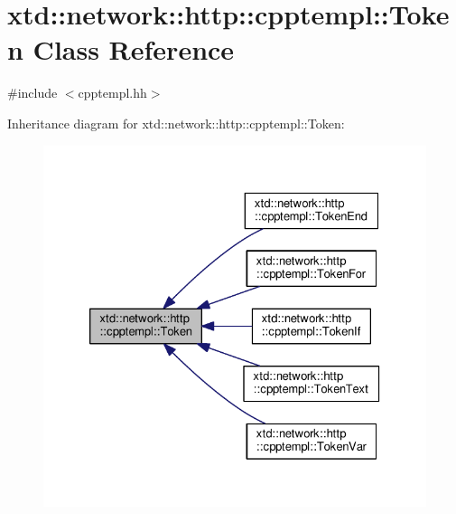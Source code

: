 \hypertarget{classxtd_1_1network_1_1http_1_1cpptempl_1_1Token}{}\section{xtd\+:\+:network\+:\+:http\+:\+:cpptempl\+:\+:Token Class Reference}
\label{classxtd_1_1network_1_1http_1_1cpptempl_1_1Token}


{\ttfamily \#include $<$cpptempl.\+hh$>$}



Inheritance diagram for xtd\+:\+:network\+:\+:http\+:\+:cpptempl\+:\+:Token\+:
\nopagebreak
\begin{figure}[H]
\begin{center}
\leavevmode
\includegraphics[width=326pt]{classxtd_1_1network_1_1http_1_1cpptempl_1_1Token__inherit__graph}
\end{center}
\end{figure}
